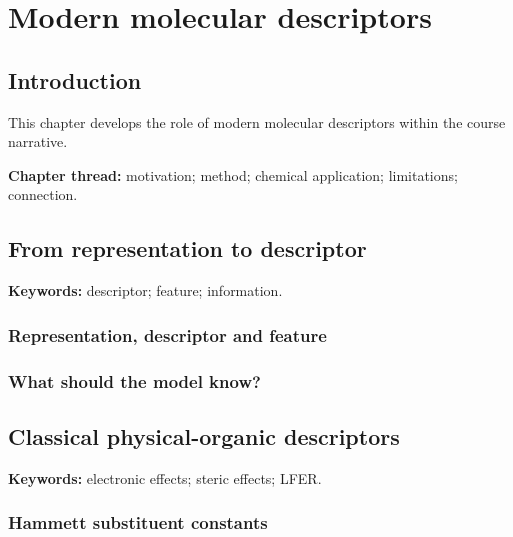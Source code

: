 
\chapter{Modern molecular descriptors}

\section{Introduction}

This chapter develops the role of modern molecular descriptors within the course narrative.

\begin{insightbox}
\textbf{Chapter thread:} motivation; method; chemical application; limitations; connection.
\end{insightbox}

\section{From representation to descriptor}

\begin{conceptbox}
\textbf{Keywords:} descriptor; feature; information.
\end{conceptbox}

\subsection{Representation, descriptor and feature}


\subsection{What should the model know?}


\section{Classical physical-organic descriptors}

\begin{conceptbox}
\textbf{Keywords:} electronic effects; steric effects; LFER.
\end{conceptbox}

\subsection{Hammett substituent constants}

